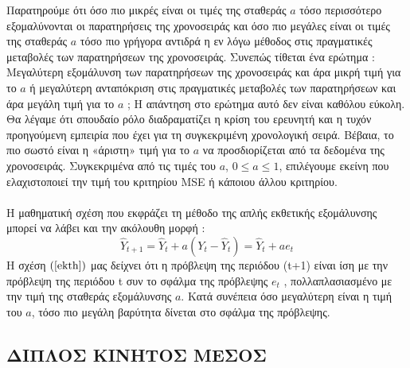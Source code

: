 Παρατηρούμε ότι όσο πιο μικρές είναι οι τιμές της σταθεράς $a$ τόσο
περισσότερο εξομαλύνονται οι παρατηρήσεις της χρονοσειράς και όσο πιο
μεγάλες είναι οι τιμές της σταθεράς $a$ τόσο πιο γρήγορα αντιδρά η εν λόγω
μέθοδος στις πραγματικές μεταβολές των παρατηρήσεων της χρονοσειράς.
Συνεπώς τίθεται ένα ερώτημα : Μεγαλύτερη εξομάλυνση των παρατηρήσεων
της χρονοσειράς και άρα μικρή τιμή για το $a$ ή μεγαλύτερη ανταπόκριση στις
πραγματικές μεταβολές των παρατηρήσεων και άρα μεγάλη τιμή για το $a$ ; Η
απάντηση στο ερώτημα αυτό δεν είναι καθόλου εύκολη. Θα λέγαμε ότι
σπουδαίο ρόλο διαδραματίζει η κρίση του ερευνητή και η τυχόν προηγούμενη
εμπειρία που έχει για τη συγκεκριμένη χρονολογική σειρά. Βέβαια, το πιο
σωστό είναι η «άριστη» τιμή για το $a$ να προσδιορίζεται από τα δεδομένα της
χρονοσειράς. Συγκεκριμένα από τις τιμές του $a$, $0 \leq a \leq 1$, επιλέγουμε εκείνη
που ελαχιστοποιεί την τιμή του κριτηρίου MSE ή κάποιου άλλου κριτηρίου.\\\\
Η μαθηματική σχέση που εκφράζει τη μέθοδο της απλής εκθετικής
εξομάλυνσης μπορεί να λάβει και την ακόλουθη μορφή :\\
\begin{equation}
\label{ekth}
\widehat{Y}_{t+1}=\widehat{Y}_t + a\left( Y_t - \widehat{Y}_t \right) = \widehat{Y}_t + a e_t 
\end{equation}
Η σχέση $\left(\ref{ekth}\right) $ μας δείχνει ότι η πρόβλεψη της περιόδου (t+1) είναι ίση με την πρόβλεψη της περιόδου t συν το σφάλμα της πρόβλεψης $e_t$ ,
πολλαπλασιασμένο με την τιμή της σταθεράς εξομάλυνσης $a$. Κατά συνέπεια
όσο μεγαλύτερη είναι η τιμή του $a$, τόσο πιο μεγάλη βαρύτητα δίνεται στο
σφάλμα της πρόβλεψης.
\subsection{ΔΙΠΛΟΣ ΚΙΝΗΤΟΣ ΜΕΣΟΣ}

